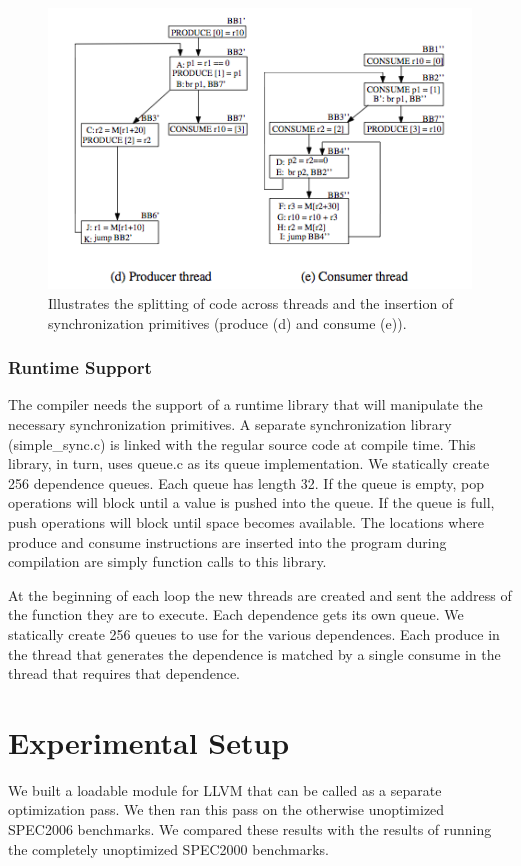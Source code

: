 \documentclass[11pt]{article}
\begin{document}
\begin{figure}
\includegraphics[scale=0.75]{sync}
\caption{Illustrates the splitting of code across threads and the insertion of synchronization primitives (produce (d) and consume (e)).}
\label{sync}
\end{figure}

\subsubsection{Runtime Support}
The compiler needs the support of a runtime library that will manipulate the necessary synchronization primitives.  A separate synchronization library (simple\_sync.c) is linked with the regular source code at compile time.  This library, in turn, uses queue.c as its queue implementation.  We statically create 256 dependence queues.  Each queue has length 32.  If the queue is empty, pop operations will block until a value is pushed into the queue.  If the queue is full, push operations will block until space becomes available.  The locations where produce and consume instructions are inserted into the program during compilation are simply function calls to this library.

At the beginning of each loop the new threads are created and sent the address of the function they are to execute.  Each dependence gets its own queue. We statically create 256 queues to use for the various dependences.  Each produce in the thread that generates the dependence is matched by a single consume in the thread that requires that dependence.

\section{Experimental Setup}
We built a loadable module for LLVM that can be called as a separate optimization pass.  We then ran this pass on the otherwise unoptimized SPEC2006 benchmarks.  We compared these results with the results of running the completely unoptimized SPEC2000 benchmarks.
\end{document}
